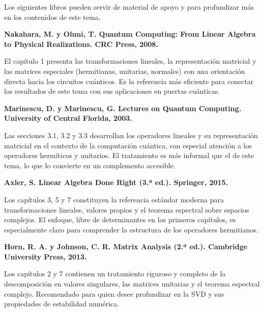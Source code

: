 
Los siguientes libros pueden servir de material de apoyo y para profundizar más en los contenidos de este tema.

\textbf{Nakahara, M. y Ohmi, T. Quantum Computing: From Linear Algebra to Physical Realizations. CRC Press, 2008.}

El capítulo 1 presenta las transformaciones lineales, la representación matricial y las matrices especiales (hermitianas, unitarias, normales) con una orientación directa hacia los circuitos cuánticos. Es la referencia más eficiente para conectar los resultados de este tema con sus aplicaciones en puertas cuánticas.

\textbf{Marinescu, D. y Marinescu, G. Lectures on Quantum Computing. University of Central Florida, 2003.}

Las secciones 3.1, 3.2 y 3.3 desarrollan los operadores lineales y su representación matricial en el contexto de la computación cuántica, con especial atención a los operadores hermíticos y unitarios. El tratamiento es más informal que el de este tema, lo que lo convierte en un complemento accesible.

\textbf{Axler, S. Linear Algebra Done Right (3.ª ed.). Springer, 2015.}

Los capítulos 3, 5 y 7 constituyen la referencia estándar moderna para transformaciones lineales, valores propios y el teorema espectral sobre espacios complejos. El enfoque, libre de determinantes en los primeros capítulos, es especialmente claro para comprender la estructura de los operadores hermitianos.

\textbf{Horn, R. A. y Johnson, C. R. Matrix Analysis (2.ª ed.). Cambridge University Press, 2013.}

Los capítulos 2 y 7 contienen un tratamiento riguroso y completo de la descomposición en valores singulares, las matrices unitarias y el teorema espectral complejo. Recomendado para quien desee profundizar en la SVD y sus propiedades de estabilidad numérica.